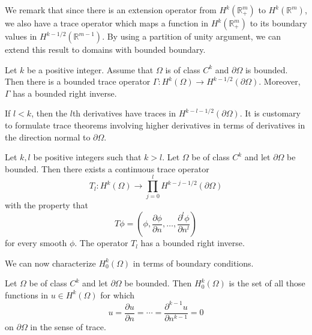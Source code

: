 We remark that since there is an extension operator from $H^k(\mathbb{R}_+^m)$ to $H^k(\mathbb{R}^m)$, we also have a trace operator which maps a function in $H^k(\mathbb{R}_+^m)$ to its boundary values in $H^{k-1/2}(\mathbb{R}^{m-1})$. By using a partition of unity argument, we can extend this result to domains with bounded boundary.

\begin{Theorem}
\label{thm:smooth-domain-trace-and-right-inverse}
Let $k$ be a positive integer. Assume that $\Omega$ is of class $C^k$ and $\partial\Omega$ is bounded. Then there is a bounded trace operator $\Gamma:H^k(\Omega)\to H^{k-1/2}(\partial\Omega)$. Moreover, $\Gamma$ has a bounded right inverse.
\end{Theorem}

If $l<k$, then the $l$th derivatives have traces in $H^{k-l-1/2}(\partial\Omega)$. It is customary to formulate trace theorems involving higher derivatives in terms of derivatives in the direction normal to $\partial\Omega$.

\begin{Theorem}
\label{thm:domain-higher-normal-trace}
Let $k,l$ be positive integers such that $k>l$. Let $\Omega$ be of class $C^k$ and let $\partial\Omega$ be bounded. Then there exists a continuous trace operator
\begin{equation}\label{eq:domain-higher-normal-trace-product-map}
T_l:H^k(\Omega)\to\prod_{j=0}^lH^{k-j-1/2}(\partial\Omega)
\end{equation}
with the property that
\begin{equation}\label{eq:domain-higher-normal-trace-smooth-values}
T\phi=\left(\phi,\dfrac{\partial\phi}{\partial n},\ldots,\dfrac{\partial^l\phi}{\partial n^l}\right)
\end{equation}
for every smooth $\phi$. The operator $T_l$ has a bounded right inverse.
\end{Theorem}

We can now characterize $H_0^k(\Omega)$ in terms of boundary conditions.

\begin{Theorem}
\label{thm:zero-boundary-sobolev-characterization}
Let $\Omega$ be of class $C^k$ and let $\partial\Omega$ be bounded. Then $H_0^k(\Omega)$ is the set of all those functions in $u\in H^k(\Omega)$ for which
\begin{equation}\label{eq:zero-boundary-sobolev-normal-trace-characterization}
u=\dfrac{\partial u}{\partial n}=\cdots=\dfrac{\partial^{k-1}u}{\partial n^{k-1}}=0
\end{equation}
on $\partial\Omega$ in the sense of trace.
\end{Theorem}

